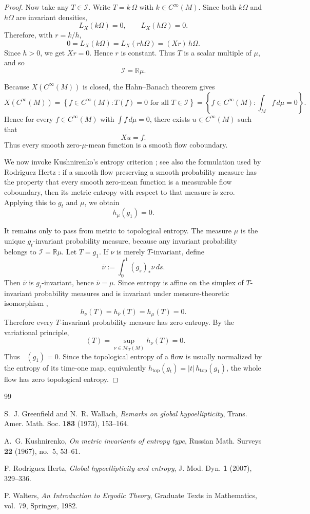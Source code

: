 \documentclass[11pt]{article}
\DeclareMathOperator{\htop}{h_{\mathrm{top}}}
\begin{document}
\begin{proof}
Now take any \(T\in \mathcal I\). Write \(T=k\,\Omega\) with \(k\in C^\infty(M)\). Since both \(k\Omega\) and \(h\Omega\) are invariant densities,
\[
L_X(k\Omega)=0,
\qquad
L_X(h\Omega)=0.
\]
Therefore, with \(r=k/h\),
\[
0=L_X(k\Omega)=L_X(rh\Omega)=(Xr)\,h\Omega.
\]
Since \(h>0\), we get \(Xr=0\). Hence \(r\) is constant. Thus \(T\) is a scalar multiple of \(\mu\), and so
\[
\mathcal I=\mathbb R\mu.
\]

Because \(X(C^\infty(M))\) is closed, the Hahn--Banach theorem gives
\[
X(C^\infty(M))
=
\left\{f\in C^\infty(M): T(f)=0 \text{ for all } T\in \mathcal I\right\}
=
\left\{f\in C^\infty(M): \int_M f\,d\mu=0\right\}.
\]
Hence for every \(f\in C^\infty(M)\) with \(\int f\,d\mu=0\), there exists \(u\in C^\infty(M)\) such that
\[
Xu=f.
\]
Thus every smooth zero-\(\mu\)-mean function is a smooth flow coboundary.

We now invoke Kushnirenko's entropy criterion \cite{Kushnirenko}; see also the formulation used by Rodriguez Hertz \cite{RH}: if a smooth flow preserving a smooth probability measure has the property that every smooth zero-mean function is a measurable flow coboundary, then its metric entropy with respect to that measure is zero. Applying this to \(g_t\) and \(\mu\), we obtain
\[
h_\mu(g_1)=0.
\]

It remains only to pass from metric to topological entropy. The measure \(\mu\) is the unique \(g_t\)-invariant probability measure, because any invariant probability belongs to \(\mathcal I=\mathbb R\mu\). Let \(T=g_1\). If \(\nu\) is merely \(T\)-invariant, define
\[
\bar\nu:=\int_0^1 (g_s)_*\nu\,ds.
\]
Then \(\bar\nu\) is \(g_t\)-invariant, hence \(\bar\nu=\mu\). Since entropy is affine on the simplex of \(T\)-invariant probability measures and is invariant under measure-theoretic isomorphism \cite{Walters},
\[
h_\nu(T)
=
h_{\bar\nu}(T)
=
h_\mu(T)
=
0.
\]
Therefore every \(T\)-invariant probability measure has zero entropy. By the variational principle,
\[
\htop(T)=\sup_{\nu\in \mathcal M_T(M)} h_\nu(T)=0.
\]
Thus \(\htop(g_1)=0\). Since the topological entropy of a flow is usually normalized by the entropy of its time-one map, equivalently \(h_{\mathrm{top}}(g_t)=|t|\,h_{\mathrm{top}}(g_1)\), the whole flow has zero topological entropy.
\end{proof}

\begin{thebibliography}{99}

S.~J. Greenfield and N.~R. Wallach,
\emph{Remarks on global hypoellipticity},
Trans. Amer. Math. Soc. \textbf{183} (1973), 153--164.

A.~G. Kushnirenko,
\emph{On metric invariants of entropy type},
Russian Math. Surveys \textbf{22} (1967), no.~5, 53--61.

F. Rodriguez Hertz,
\emph{Global hypoellipticity and entropy},
J. Mod. Dyn. \textbf{1} (2007), 329--336.

P. Walters,
\emph{An Introduction to Ergodic Theory},
Graduate Texts in Mathematics, vol.~79, Springer, 1982.

\end{thebibliography}
\end{document}
